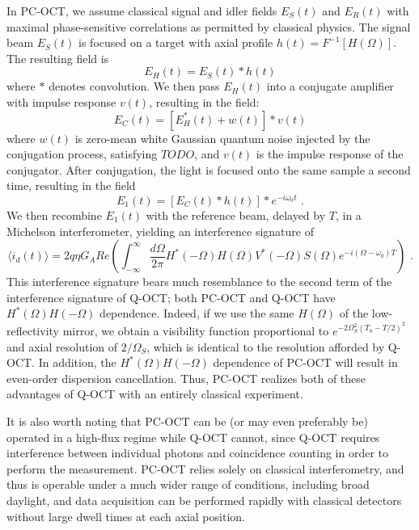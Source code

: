 In PC-OCT, we assume classical signal and idler fields $E_S(t)$ and $E_R(t)$ with maximal phase-sensitive correlations as permitted by classical physics. The signal beam $E_S(t)$ is focused on a target with axial profile $h(t) = F^{-1}[H(\Omega)]$. The resulting field is
\begin{equation}
E_H(t) = E_S(t) * h(t)
\end{equation}
where $*$ denotes convolution. We then pass $E_H(t)$ into a conjugate amplifier with impulse response $v(t)$, resulting in the field:
\begin{equation}
E_C(t) = \left[ E_H^*(t) + w(t) \right] * v(t)
\end{equation}
where $w(t)$ is zero-mean white Gaussian quantum noise injected by the conjugation process, satisfying $TODO$, and $v(t)$ is the impulse response of the conjugator. After conjugation, the light is focused onto the same sample a second time, resulting in the field
\begin{equation}
E_1(t) = \left[ E_C(t) * h(t) \right] * e^{-i\omega_0 t}\,\,.
\end{equation}
We then recombine $E_1(t)$ with the reference beam, delayed by $T$, in a Michelson interferometer, yielding an interference signature of
\begin{equation}
\langle i_d(t) \rangle = 2q\eta G_A Re \left( \int_{-\infty}^{\infty} \frac{d\Omega}{2\pi} H^*(-\Omega)H(\Omega)V^*(-\Omega)S(\Omega) e^{-i(\Omega-\omega_0)T} \right)\,\,.
\end{equation}
This interference signature bears much resemblance to the second term of the interference signature of Q-OCT; both PC-OCT and Q-OCT have $H^*(\Omega)H(-\Omega)$ dependence. Indeed, if we use the same $H(\Omega)$ of the low-reflectivity mirror, we obtain a visibility function proportional to $e^{-2\Omega_S^2(T_0 - T/2)^2}$ and axial resolution of $2/\Omega_S$, which is identical to the resolution afforded by Q-OCT. In addition, the $H^*(\Omega)H(-\Omega)$ dependence of PC-OCT will result in even-order dispersion cancellation. Thus, PC-OCT realizes both of these advantages of Q-OCT with an entirely classical experiment.

It is also worth noting that PC-OCT can be (or may even preferably be) operated in a high-flux regime while Q-OCT cannot, since Q-OCT requires interference between individual photons and coincidence counting in order to perform the measurement. PC-OCT relies solely on classical interferometry, and thus is operable under a much wider range of conditions, including broad daylight, and data acquisition can be performed rapidly with classical detectors without large dwell times at each axial position.

